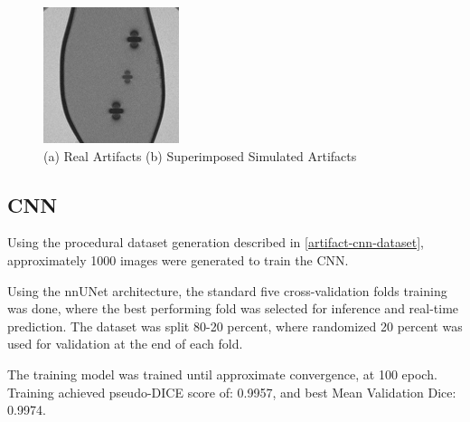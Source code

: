\documentclass[conference]{IEEEtran}
\begin{document}
\begin{figure}[h]
\begin{minipage}{0.241\textwidth}
        \includegraphics[width=\textwidth]{Conference/img/artifact-generated-superimposed.jpg}
    \end{minipage}\hfill \hspace*{0cm}
    \caption{(a) Real Artifacts
    (b) Superimposed Simulated Artifacts}
    \label{fig:real-artifact-vs-simulated-comparison}
\end{figure}

\subsection{CNN}

Using the procedural dataset generation described in \ref{artifact-cnn-dataset}, approximately 1000 images were generated to train the CNN.

Using the nnUNet architecture, the standard five cross-validation folds training was done, where the best performing fold was selected for inference and real-time prediction. The dataset was split 80-20 percent, where randomized 20 percent was used for validation at the end of each fold.

The training model was trained until approximate convergence, at 100 epoch. Training achieved pseudo-DICE score of: 0.9957, and best Mean Validation Dice: 0.9974.
\end{document}
